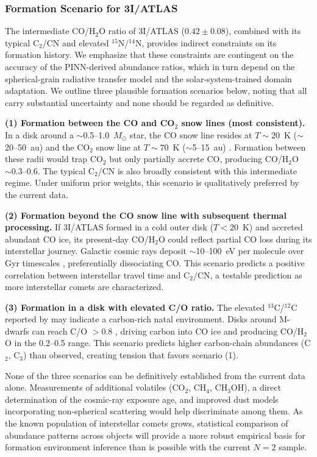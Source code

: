 \documentclass[preprint2]{aastex631}
\begin{document}
\subsubsection{Formation Scenario for 3I/ATLAS}

The intermediate CO/H$_2$O ratio of 3I/ATLAS ($0.42 \pm 0.08$), combined with its typical C$_2$/CN and elevated $^{15}$N/$^{14}$N, provides indirect constraints on its formation history. We emphasize that these constraints are contingent on the accuracy of the PINN-derived abundance ratios, which in turn depend on the spherical-grain radiative transfer model and the solar-system-trained domain adaptation. We outline three plausible formation scenarios below, noting that all carry substantial uncertainty and none should be regarded as definitive.

\textbf{(1) Formation between the CO and CO$_2$ snow lines (most consistent).} In a disk around a $\sim$0.5--1.0~$M_\odot$ star, the CO snow line resides at $T \sim 20$~K ($\sim$20--50~au) and the CO$_2$ snow line at $T \sim 70$~K ($\sim$5--15~au) \citep{qi15}. Formation between these radii would trap CO$_2$ but only partially accrete CO, producing CO/H$_2$O $\sim 0.3$--0.6. The typical C$_2$/CN is also broadly consistent with this intermediate regime. Under uniform prior weights, this scenario is qualitatively preferred by the current data.

\textbf{(2) Formation beyond the CO snow line with subsequent thermal processing.} If 3I/ATLAS formed in a cold outer disk ($T < 20$~K) and accreted abundant CO ice, its present-day CO/H$_2$O could reflect partial CO loss during its interstellar journey. Galactic cosmic rays deposit $\sim$10--100~eV per molecule over Gyr timescales \citep{gerakines01}, preferentially dissociating CO. This scenario predicts a positive correlation between interstellar travel time and C$_2$/CN, a testable prediction as more interstellar comets are characterized.

\textbf{(3) Formation in a disk with elevated C/O ratio.} The elevated $^{13}$C/$^{12}$C reported by \citet{opitom26} may indicate a carbon-rich natal environment. Disks around M-dwarfs can reach C/O $> 0.8$ \citep{bergin14}, driving carbon into CO ice and producing CO/H$_2$O in the 0.2--0.5 range. This scenario predicts higher carbon-chain abundances (C$_2$, C$_3$) than observed, creating tension that favors scenario (1).

None of the three scenarios can be definitively established from the current data alone. Measurements of additional volatiles (CO$_2$, CH$_4$, CH$_3$OH), a direct determination of the cosmic-ray exposure age, and improved dust models incorporating non-spherical scattering would help discriminate among them. As the known population of interstellar comets grows, statistical comparison of abundance patterns across objects will provide a more robust empirical basis for formation environment inference than is possible with the current $N=2$ sample.
\end{document}
